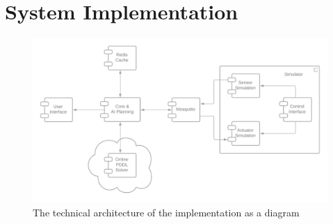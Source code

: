 \section{System Implementation}



\begin{figure}
    \centering
    \includegraphics[width=\linewidth]{img/implementation-architecture.png}
    \caption{The technical architecture of the implementation as a diagram}
    \label{fig:implementation-architecture}
\end{figure}







